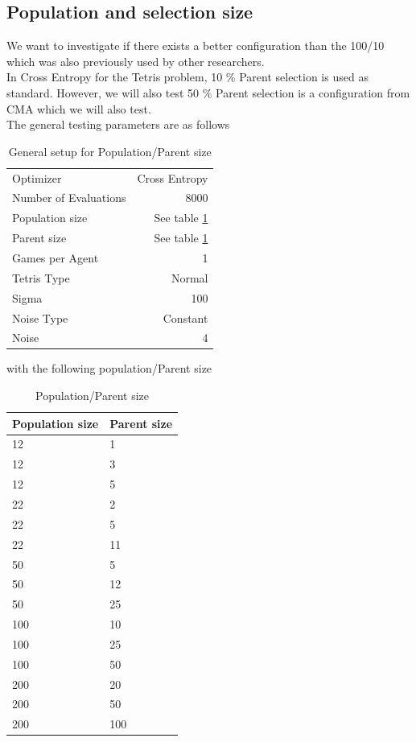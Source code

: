 \clearpage

\subsection{Population and selection size}
We want to investigate if there exists a better configuration than the 100/10 which was also previously used by other researchers.\\
In Cross Entropy for the Tetris problem, 10 \% Parent selection is used as standard. However, we will also test 50 \% Parent selection is a configuration from CMA which we will also test.\\
The general testing parameters are as follows
\begin{table}[h]
\centering
\begin{tabular}{l r}
Optimizer & Cross Entropy\\
Number of Evaluations & 8000\\
Population size & See table \ref{CEPopulationParentSize}\\
Parent size & See table \ref{CEPopulationParentSize}\\
Games per Agent & 1\\
Tetris Type & Normal\\
\hline
Sigma & 100\\
Noise Type & Constant\\
Noise & 4
\end{tabular}
\caption{General setup for Population/Parent size}
\end{table}

with the following population/Parent size

\begin{table}[h]
\centering
\begin{tabular}{l l}
Population size & Parent size\\
\hline
12 & 1\\
12 & 3\\
12 & 5\\
22 & 2\\
22 & 5\\
22 & 11\\
50 & 5\\
50 & 12\\
50 & 25\\
100 & 10\\
100 & 25\\
100 & 50\\
200 & 20\\
200 & 50\\
200 & 100
\end{tabular}
\caption{Population/Parent size \label{CEPopulationParentSize}}
\end{table}

